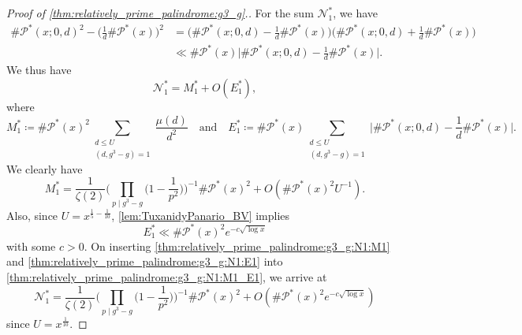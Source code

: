 \documentclass{amsart}
\theoremstyle{plain}
\theoremstyle{definition}
\renewcommand{\and}{\quad\text{and}\quad}
\begin{document}
\begin{proof}[Proof of \cref{thm:relatively_prime_palindrome:g3_g}.]
For the sum $\mathscr{N}_{1}^{\ast}$, we have
\begin{align}
\#\mathscr{P}^{\ast}(x;0,d)^{2}
-
\biggl(\frac{1}{d}\#\mathscr{P}^{\ast}(x)\biggr)^{2}
&=
\biggl(
\#\mathscr{P}^{\ast}(x;0,d)
-
\frac{1}{d}
\#\mathscr{P}^{\ast}(x)
\biggr)
\biggl(
\#\mathscr{P}^{\ast}(x;0,d)
+
\frac{1}{d}
\#\mathscr{P}^{\ast}(x)
\biggr)\\
&\ll
\#\mathscr{P}^{\ast}(x)
\biggl|
\#\mathscr{P}^{\ast}(x;0,d)
-
\frac{1}{d}
\#\mathscr{P}^{\ast}(x)
\biggr|.
\end{align}
We thus have
\begin{equation}
\label{thm:relatively_prime_palindrome:g3_g:N1:M1_E1}
\mathscr{N}_{1}^{\ast}
=
M_{1}^{\ast}
+
O(E_{1}^{\ast}),
\end{equation}
where
\[
M_{1}^{\ast}
\coloneqq
\#\mathscr{P}^{\ast}(x)^{2}
\sum_{\substack{
d\le U\\
(d,g^{3}-g)=1
}}
\frac{\mu(d)}{d^{2}}
\and
E_{1}^{\ast}
\coloneqq
\#\mathscr{P}^{\ast}(x)
\sum_{\substack{
d\le U\\
(d,g^{3}-g)=1
}}
\biggl|
\#\mathscr{P}^{\ast}(x;0,d)
-
\frac{1}{d}
\#\mathscr{P}^{\ast}(x)
\biggr|.
\]
We clearly have
\begin{equation}
\label{thm:relatively_prime_palindrome:g3_g:N1:M1}
M_{1}^{\ast}
=
\frac{1}{\zeta(2)}
\biggl(\prod_{p\mid g^{3}-g}\biggl(1-\frac{1}{p^{2}}\biggr)\biggr)^{-1}
\#\mathscr{P}^{\ast}(x)^{2}
+
O(\#\mathscr{P}^{\ast}(x)^{2}U^{-1}).
\end{equation}
Also, since $U=x^{\frac{1}{5}-\frac{1}{10}}$, \cref{lem:TuxanidyPanario_BV} implies
\begin{equation}
\label{thm:relatively_prime_palindrome:g3_g:N1:E1}
E_{1}^{\ast}
\ll
\#\mathscr{P}^{\ast}(x)^{2}
e^{-c\sqrt{\log x}}
\end{equation}
with some $c>0$. On inserting \cref{thm:relatively_prime_palindrome:g3_g:N1:M1}
and \cref{thm:relatively_prime_palindrome:g3_g:N1:E1} into
\cref{thm:relatively_prime_palindrome:g3_g:N1:M1_E1}, we arrive at
\begin{equation}
\label{thm:relatively_prime_palindrome:g3_g:N1}
\mathscr{N}_{1}^{\ast}
=
\frac{1}{\zeta(2)}
\biggl(\prod_{p\mid g^{3}-g}\biggl(1-\frac{1}{p^{2}}\biggr)\biggr)^{-1}
\#\mathscr{P}^{\ast}(x)^{2}
+
O(
\#\mathscr{P}^{\ast}(x)^{2}e^{-c\sqrt{\log x}}
)
\end{equation}
since $U=x^{\frac{1}{10}}$.


\end{proof}
\end{document}
